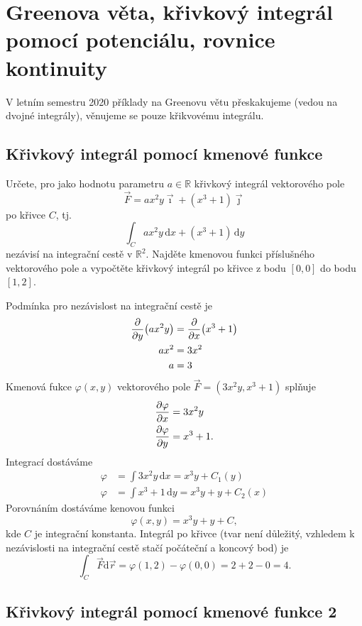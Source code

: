 \section{Greenova věta, křivkový integrál pomocí potenciálu, rovnice kontinuity}

V letním semestru 2020 příklady na Greenovu větu přeskakujeme (vedou na dvojné integrály), věnujeme se pouze křikvovému integrálu. 


\subsection{Křivkový integrál pomocí kmenové funkce}


Určete, pro jako hodnotu parametru $a\in \mathbb R$ křivkový integrál vektorového pole $$\vec F=ax^2y\vec\imath + (x^3+1)\vec\jmath$$ po křivce $C$, tj. $$\int_C ax^2y\,\mathrm dx+(x^3+1)\,\mathrm dy$$ nezávisí na integrační cestě v $\mathbb R^2$. Najděte kmenovou funkci příslušného vektorového pole a vypočtěte křivkový integrál po křivce z bodu $[0,0]$ do bodu $[1,2]$.

\reseni

Podmínka pro nezávislost na integrační cestě je $$
\begin{aligned}
  \pdv{y}(ax^2y)&=\pdv{x}(x^3+1)\\
  ax^2&=3x^2\\
  a&=3
\end{aligned}
$$
Kmenová fukce $\varphi(x,y)$ vektorového pole $\vec F=(3x^2y,x^3+1)$ splňuje
$$
\begin{aligned}
  \pdv{\varphi}{x}&=3x^2y \\  \pdv{\varphi}{y}&=x^3+1.
\end{aligned}
$$
Integrací dostáváme
$$
\begin{aligned}
  \varphi &= \int 3x^2y\,\mathrm dx=x^3y+C_1(y)\\
  \varphi &= \int x^3+1\,\mathrm dy=x^3y+y+C_2(x)
\end{aligned}
$$
Porovnáním dostáváme kenovou funkci $$\varphi (x,y)=x^3y+y+C,$$ kde $C$ je integrační konstanta. Integrál po křivce (tvar není důležitý, vzhledem k nezávislosti na integrační cestě stačí počáteční a koncový bod) je
$$\int _C \vec F\mathrm d\vec r=\varphi(1,2)-\varphi(0,0)=2+2-0=4.$$


\konec

\subsection{Křivkový integrál pomocí kmenové funkce 2}

